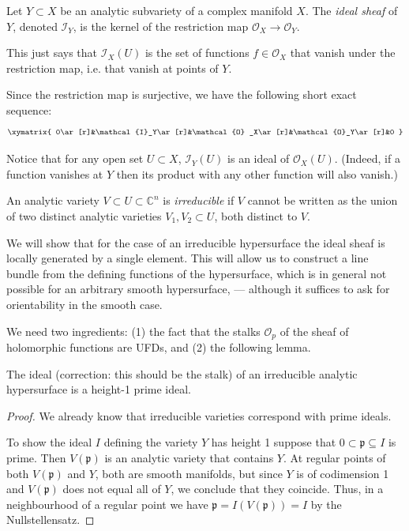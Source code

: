 \documentclass{book}
\begin{document}
\begin{definition}
\label{definition-ideal-sheaf}
Let $Y \subset X$ be an analytic subvariety
of a complex manifold $X$.
The {\it ideal sheaf} of $Y$, denoted
$\mathcal{I}_Y$,
is the kernel
of the restriction map $\mathcal{O}_X \to
\mathcal{O}_Y$.
\end{definition}

\noindent
This just says that $\mathcal{I}_X(U)$ is the
set of functions $f \in \mathcal{O}_X$ that
vanish under the restriction map, i.e.
that vanish at points of $Y$.

Since the restriction map is surjective,
we have the following short exact sequence:
$$
\xymatrix{
0\ar[r]&\mathcal{I}_Y\ar[r]&\mathcal{O}
_X\ar[r]&\mathcal{O}_Y\ar[r]&0
}
$$

\medskip\noindent
Notice that for any open set $U\subset X$,
$\mathcal{I}_Y(U)$ is an ideal of
$\mathcal{O}_X(U)$. (Indeed,
if a function vanishes at $Y$ then its
product
with any other function will also vanish.)

\begin{definition}
\label{definition-irreducible-variety}
An analytic variety $V\subset U\subset
\mathbb{C}^n$ is {\it irreducible} if
$V$ cannot be written as the union of two
distinct analytic varieties
$V_1,V_2\subset U$, both distinct to $V$.
\end{definition}

\medskip\noindent
We will show that for the case of an
irreducible hypersurface
the ideal sheaf is locally generated by a
single element.
This will allow us to construct a line bundle
from the defining functions
of the hypersurface, which is in general not
possible
for an arbitrary smooth hypersurface,
--- although it suffices to ask for
orientability in the
smooth case.

We need two ingredients:
(1) the fact that the stalks $\mathcal{O}_p$
of the
sheaf of holomorphic functions are UFDs,
and (2) the following lemma.

\begin{lemma}
\label{lemma-ideal-irred-hyper-heigh-1}
The ideal
(correction: this should be the stalk)
of an irreducible analytic hypersurface is a
height-1 prime ideal.
\end{lemma}

\begin{proof}
We already know that irreducible varieties
correspond with prime ideals.

To show the ideal $I$ defining the variety
$Y$ has height 1
suppose that $0 \subset \mathfrak{p}
\subseteq I$ is prime.
Then $V(\mathfrak{p})$ is an analytic variety
that contains $Y$.
At regular points of both $V(\mathfrak{p})$
and $Y$,
both are smooth manifolds, but since $Y$ is
of codimension 1 and
$V(\mathfrak{p})$ does not equal all of  $Y$,
we conclude that they coincide.
Thus, in a neighbourhood
of a regular point we have
$\mathfrak{p}=I(V(\mathfrak{p}))=I$ by the
Nullstellensatz.
\end{proof}
\end{document}
